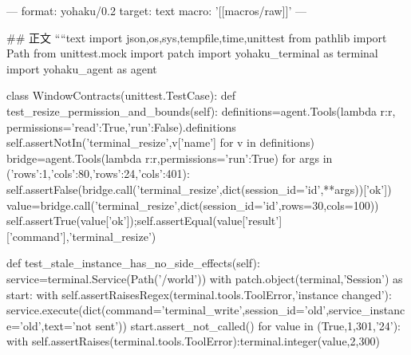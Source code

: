 ---
format: yohaku/0.2
target: text
macro: '[[macros/raw]]'
---

## 正文
````text
import json,os,sys,tempfile,time,unittest
from pathlib import Path
from unittest.mock import patch
import yohaku_terminal as terminal
import yohaku_agent as agent

class WindowContracts(unittest.TestCase):
    def test_resize_permission_and_bounds(self):
        definitions=agent.Tools(lambda r:r, permissions={'read':True,'run':False}).definitions
        self.assertNotIn('terminal_resize',{v['name'] for v in definitions})
        bridge=agent.Tools(lambda r:r,permissions={'run':True})
        for args in ({'rows':1,'cols':80},{'rows':24,'cols':401}):
            self.assertFalse(bridge.call('terminal_resize',dict(session_id='id',**args))['ok'])
        value=bridge.call('terminal_resize',dict(session_id='id',rows=30,cols=100))
        self.assertTrue(value['ok']);self.assertEqual(value['result']['command'],'terminal_resize')

    def test_stale_instance_has_no_side_effects(self):
        service=terminal.Service(Path('/world'))
        with patch.object(terminal,'Session') as start:
            with self.assertRaisesRegex(terminal.tools.ToolError,'instance changed'):
                service.execute(dict(command='terminal_write',session_id='old',service_instance='old',text='not sent'))
            start.assert_not_called()
        for value in (True,1,301,'24'):
            with self.assertRaises(terminal.tools.ToolError):terminal.integer(value,2,300)


